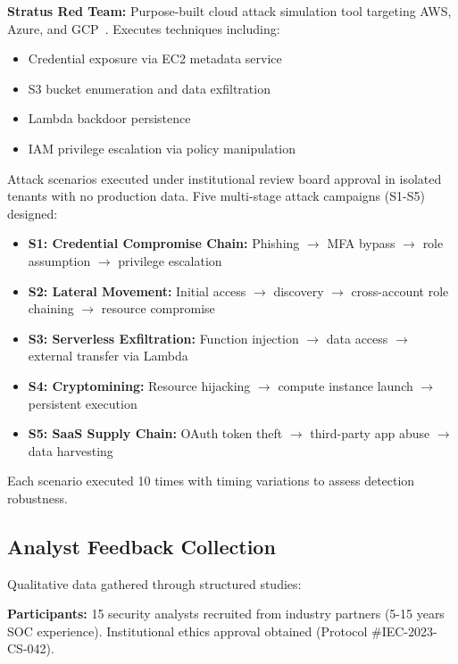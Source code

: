 \textbf{Stratus Red Team:} Purpose-built cloud attack simulation tool targeting AWS, Azure, and GCP~\cite{stratusredteam2023}. Executes techniques including:
\begin{itemize}
    \item Credential exposure via EC2 metadata service
    \item S3 bucket enumeration and data exfiltration
    \item Lambda backdoor persistence
    \item IAM privilege escalation via policy manipulation
\end{itemize}

Attack scenarios executed under institutional review board approval in isolated tenants with no production data. Five multi-stage attack campaigns (S1-S5) designed:
\begin{itemize}
    \item \textbf{S1: Credential Compromise Chain:} Phishing $\rightarrow$ MFA bypass $\rightarrow$ role assumption $\rightarrow$ privilege escalation
    \item \textbf{S2: Lateral Movement:} Initial access $\rightarrow$ discovery $\rightarrow$ cross-account role chaining $\rightarrow$ resource compromise
    \item \textbf{S3: Serverless Exfiltration:} Function injection $\rightarrow$ data access $\rightarrow$ external transfer via Lambda
    \item \textbf{S4: Cryptomining:} Resource hijacking $\rightarrow$ compute instance launch $\rightarrow$ persistent execution
    \item \textbf{S5: SaaS Supply Chain:} OAuth token theft $\rightarrow$ third-party app abuse $\rightarrow$ data harvesting
\end{itemize}

Each scenario executed 10 times with timing variations to assess detection robustness.

\subsection{Analyst Feedback Collection}
Qualitative data gathered through structured studies:

\textbf{Participants:} 15 security analysts recruited from industry partners (5-15 years SOC experience). Institutional ethics approval obtained (Protocol \#IEC-2023-CS-042).

